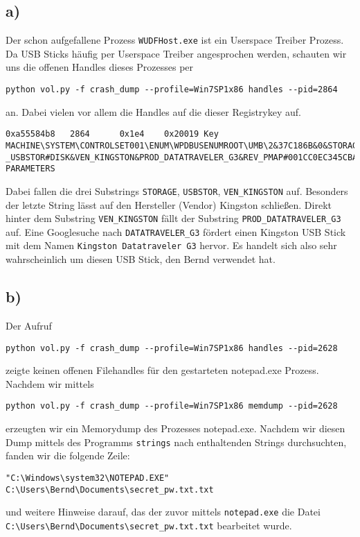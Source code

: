 \documentclass[10pt,a4paper]{article}
\begin{document}
\subsection*{a)}
Der schon aufgefallene Prozess \texttt{WUDFHost.exe} ist ein Userspace Treiber Prozess. Da USB Sticks häufig per Userspace Treiber angesprochen werden, schauten wir uns die offenen Handles dieses Prozesses per 
\begin{verbatim}
python vol.py -f crash_dump --profile=Win7SP1x86 handles --pid=2864
\end{verbatim}
an. Dabei vielen vor allem die Handles auf die dieser Registrykey auf.
\begin{lstlisting}
0xa55584b8   2864      0x1e4    0x20019 Key              MACHINE\SYSTEM\CONTROLSET001\ENUM\WPDBUSENUMROOT\UMB\2&37C186B&0&STORAGE#VOLUME#_??_USBSTOR#DISK&VEN_KINGSTON&PROD_DATATRAVELER_G3&REV_PMAP#001CC0EC345CBA9175C40135&0#\DEVICE PARAMETERS
\end{lstlisting}
Dabei fallen die drei Substrings  \texttt{STORAGE}, \texttt{USBSTOR}, \texttt{VEN\_KINGSTON} auf. Besonders der letzte String lässt auf den Hersteller (Vendor) Kingston schließen. Direkt hinter dem Substring \texttt{VEN\_KINGSTON} fällt der Substring \texttt{PROD\_DATATRAVELER\_G3} auf. Eine Googlesuche nach \texttt{DATATRAVELER\_G3} fördert einen Kingston USB Stick mit dem Namen \texttt{Kingston Datatraveler G3} hervor. Es handelt sich also sehr wahrscheinlich um diesen USB Stick, den Bernd verwendet hat.

\subsection*{b)}

Der Aufruf
\begin{verbatim}
python vol.py -f crash_dump --profile=Win7SP1x86 handles --pid=2628
\end{verbatim}
zeigte keinen offenen Filehandles für den gestarteten notepad.exe Prozess.
Nachdem wir mittels
\begin{verbatim}
python vol.py -f crash_dump --profile=Win7SP1x86 memdump --pid=2628
\end{verbatim}
erzeugten wir ein Memorydump des Prozesses notepad.exe. Nachdem wir diesen Dump mittels des Programms \texttt{strings} nach enthaltenden Strings durchsuchten, fanden wir die folgende Zeile:
\begin{verbatim}
"C:\Windows\system32\NOTEPAD.EXE" C:\Users\Bernd\Documents\secret_pw.txt.txt
\end{verbatim}
und weitere Hinweise darauf, das der zuvor mittels \texttt{notepad.exe} die Datei \\\texttt{C:\textbackslash Users\textbackslash Bernd\textbackslash Documents\textbackslash secret\_pw.txt.txt} bearbeitet wurde.
\end{document}
